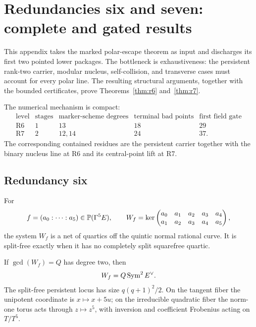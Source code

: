 \section{Redundancies six and seven: complete and gated results}
\label{sec:r67}

This appendix takes the marked polar-escape theorem as input and discharges
its first two pointed lower packages.  The bottleneck is exhaustiveness: the
persistent rank-two carrier, modular nucleus, self-collision, and transverse
cases must account
for every polar line.  The resulting structural arguments, together with the
bounded certificates, prove Theorems~\ref{thm:r6} and~\ref{thm:r7}.

The numerical mechanism is compact:
\[
\begin{array}{c|c|c|c|c}
\text{level}&\text{stages}&\text{marker-scheme degrees}
 &\text{terminal bad points}&\text{first field gate}\\ \hline
\mathrm{R6}&1&13&18&29\\
\mathrm{R7}&2&12,14&24&37.
\end{array}
\]
The corresponding contained residues are the persistent carrier together with
the binary nucleus line at R6 and its central-point lift at R7.

\subsection{Redundancy six}

For
\[
 f=(a_0:\cdots:a_5)\in\mathbb P(\Gamma^5E),\qquad
 W_f=\ker
 \begin{pmatrix}
 a_0&a_1&a_2&a_3&a_4\\
 a_1&a_2&a_3&a_4&a_5
 \end{pmatrix},
\]
the system $W_f$ is a net of quartics off the quintic normal rational
curve.  It is split-free exactly when it has no completely split
squarefree quartic.

\begin{proposition}\label{prop:r6-persistent}%
%
%
If $\gcd(W_f)=Q$ has degree two, then
\[
       W_f=Q\operatorname{Sym}^2E^\vee.
\]
The split-free persistent locus has size $q(q+1)^2/2$.  On the tangent fiber
the unipotent coordinate is $x\mapsto x+5u$; on the irreducible
quadratic fiber the norm-one torus acts through $z\mapsto z^5$, with
inversion and coefficient Frobenius acting on $T/T^5$.
\end{proposition}

